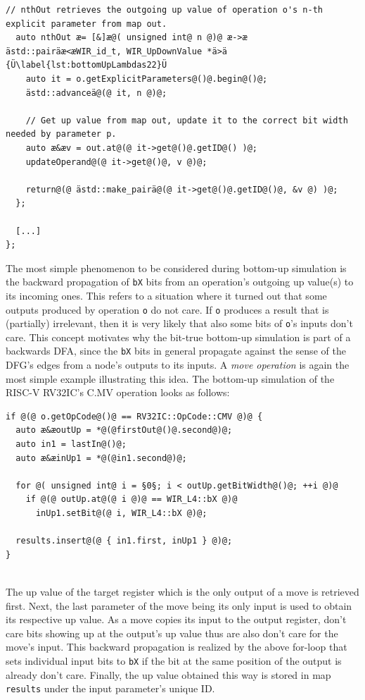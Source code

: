 \begin{enumerate}[resume]
\begin{lstlisting}[style=code,float=!t,caption={Definition of Lambdas for Bottom-Up Analysis (ctd.)},label=lst:bottomUpLambdas2]
  // nthOut retrieves the outgoing up value of operation o's n-th explicit parameter from map out.
  auto nthOut æ= [&]æ@( unsigned int@ n @)@ æ->æ ästd::pairäæ<æWIR_id_t, WIR_UpDownValue *ä>ä {Ü\label{lst:bottomUpLambdas22}Ü
    auto it = o.getExplicitParameters@()@.begin@()@;
    ästd::advanceä@(@ it, n @)@;

    // Get up value from map out, update it to the correct bit width needed by parameter p.
    auto æ&æv = out.at@(@ it->get@()@.getID@() )@;
    updateOperand@(@ it->get@()@, v @)@;

    return@(@ ästd::make_pairä@(@ it->get@()@.getID@()@, &v @) )@;
  };

  [...]
};
\end{lstlisting}

  The most simple phenomenon to be considered during bottom-up simulation is the backward propagation of \texttt{bX} bits from an operation's outgoing up value(s) to its incoming ones.
  This refers to a situation where it turned out that some outputs produced by operation \texttt{o} do not care.
  If \texttt{o} produces a result that is (partially) irrelevant, then it is very likely that also some bits of \texttt{o}'s inputs don't care.
  This concept motivates why the bit-true bottom-up simulation is part of a backwards \gls{DFA}, since the \texttt{bX} bits in general propagate against the sense of the \gls{DFG}'s edges from a node's outputs to its inputs.
  A \emph{move operation} is again the most simple example illustrating this idea. The bottom-up simulation of the RISC-V RV32IC's C.MV operation looks as follows: \\
\begin{lstlisting}[style=code,float=!h,xleftmargin=10mm,aboveskip=-0.8 \baselineskip,belowskip=-0.8 \baselineskip]
if @(@ o.getOpCode@()@ == RV32IC::OpCode::CMV @)@ {
  auto æ&æoutUp = *@(@firstOut@()@.second@)@;
  auto in1 = lastIn@()@;
  auto æ&æinUp1 = *@(@in1.second@)@;

  for @( unsigned int@ i = §0§; i < outUp.getBitWidth@()@; ++i @)@
    if @(@ outUp.at@(@ i @)@ == WIR_L4::bX @)@
      inUp1.setBit@(@ i, WIR_L4::bX @)@;

  results.insert@(@ { in1.first, inUp1 } @)@;
}
\end{lstlisting}
  \\
  The up value of the target register which is the only output of a move is retrieved first.
  Next, the last parameter of the move being its only input is used to obtain its respective up value.
  As a move copies its input to the output register, don't care bits showing up at the output's up value thus are also don't care for the move's input.
  This backward propagation is realized by the above for-loop that sets individual input bits to \texttt{bX} if the bit at the same position of the output is already don't care.
  Finally, the up value obtained this way is stored in map \texttt{results} under the input parameter's unique ID.


\end{enumerate}
